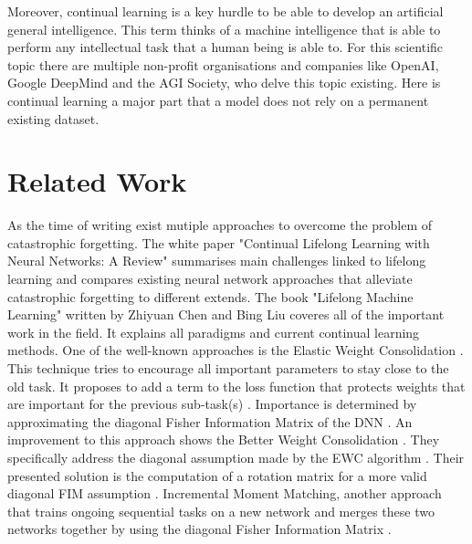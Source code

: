 Moreover, continual learning is a key hurdle to be able to develop an artificial general intelligence.
This term thinks of a machine intelligence that is able to perform any intellectual task that a human being is able to.
For this scientific topic there are multiple non-profit organisations and companies like OpenAI, Google DeepMind and the AGI Society, who delve this topic existing.
Here is continual learning a major part that a model does not rely on a permanent existing dataset.

\section{Related Work}
\label{intro_related_work}

As the time of writing exist mutiple approaches to overcome the problem of catastrophic forgetting.
The white paper "Continual Lifelong Learning with Neural Networks: A Review" \cite{lifelong_learning_review} summarises main challenges linked to lifelong learning and compares existing neural network approaches that alleviate catastrophic forgetting to different extends.
The book "Lifelong Machine Learning" \cite{lifelong-machine-learning-book} written by Zhiyuan Chen and Bing Liu coveres all of the important work in the field.
It explains all paradigms and current continual learning methods.
\newline
One of the well-known approaches is the Elastic Weight Consolidation \cite{elastic-weight-consolidation}.
This technique tries to encourage all important parameters to stay close to the old task.
It proposes to add a term to the loss function that protects weights that are important for the previous sub-task(s) \cite{elastic-weight-consolidation}. 
Importance is determined by approximating the diagonal Fisher Information Matrix of the DNN \cite{cf_application_oriented_study, elastic-weight-consolidation}.
An improvement to this approach shows the Better Weight Consolidation \cite{better-weight-consolidation}.
They specifically address the diagonal assumption made by the EWC algorithm \cite{better-weight-consolidation}.
Their presented solution is the computation of a rotation matrix for a more valid diagonal FIM assumption \cite{better-weight-consolidation}.
\newline
Incremental Moment Matching, another approach that trains ongoing sequential tasks on a new network and merges these two networks together by using the diagonal Fisher Information Matrix \cite{incremental-moment-matching}.
